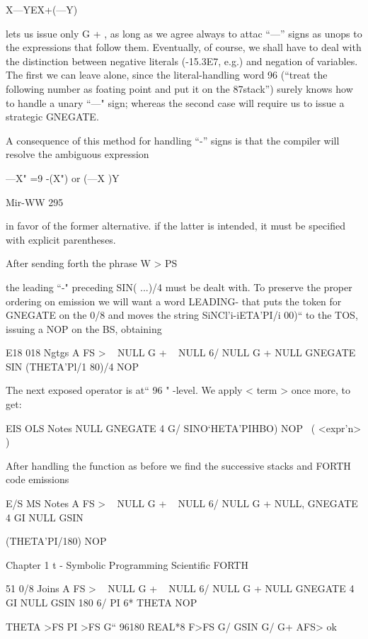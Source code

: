 X—YEX+(—Y)

lets us issue only G + , as long as we agree always to attac “—”
signs as unops to the expressions that follow them. Eventually,
of course, we shall have to deal with the distinction between
negative literals (-15.3E7, e.g.) and negation of variables. The
first we can leave alone, since the literal-handling word 96 (“treat
the following number as foating point and put it on the 87stack”)
surely knows how to handle a unary “—" sign; whereas the second
case will require us to issue a strategic GNEGATE.

A consequence of this method for handling “-” signs is that the
compiler will resolve the ambiguous expression

—X" =9 -(X") or (—X )Y

Mir-WW 295

in favor of the former alternative. if the latter is intended, it must
be specified with explicit parentheses.

After sending forth the phrase
W > PS

the leading “-" preceding SIN( ...)/4 must be dealt with. To
preserve the proper ordering on emission we will want a word
LEADING- that puts the token for GNEGATE on the 0/8 and
moves the string SiNCl'i-iETA'PI/i 00)“ to the TOS, issuing a
NOP on the BS, obtaining

 

E18 018 Ngtgs
A FS > \ < subject >
NULL G + \ < term >
NULL 6/
NULL G +
NULL GNEGATE
SIN (THETA'Pl/1 80)/4 NOP

The next exposed operator is at“ 96 " -level. We apply < term >
once more, to get:

 

EIS OLS Notes
NULL GNEGATE
4 G/
SINO‘HETA'PIHBO) NOP \ ( <expr'n> )

After handling the function as before we find the successive stacks
and FORTH code emissions

 

E/S MS Notes
A FS > \ < subject >
NULL G + \ < term >
NULL 6/
NULL G +
NULL, GNEGATE
4 GI
NULL GSIN

(THETA'PI/180) NOP

Chapter 1 t - Symbolic Programming Scientific FORTH

 

51 0/8 Joins
A FS > \ < subject >
NULL G + \ < term >
NULL 6/
NULL G +
NULL GNEGATE
4 GI
NULL GSIN
180 6/
PI 6*
THETA NOP

THETA >FS PI >FS G“ 96180 REAL*8 F>FS
G/ GSIN %
G/ G+ AFS> ok


